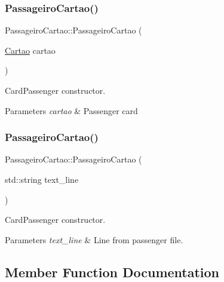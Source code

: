 \subsubsection{\texorpdfstring{Passageiro\+Cartao()}{PassageiroCartao()}\hspace{0.1cm}{\footnotesize\ttfamily [1/2]}}
{\footnotesize\ttfamily Passageiro\+Cartao\+::\+Passageiro\+Cartao (\begin{DoxyParamCaption}\item[{\hyperlink{class_cartao}{Cartao}}]{cartao }\end{DoxyParamCaption})}



Card\+Passenger constructor. 


\begin{DoxyParams}{Parameters}
{\em cartao} & Passenger card \\
\hline
\end{DoxyParams}
\mbox{\label{class_passageiro_cartao_a96bbc29d77b054eb31890230079f0961}} 
\subsubsection{\texorpdfstring{Passageiro\+Cartao()}{PassageiroCartao()}\hspace{0.1cm}{\footnotesize\ttfamily [2/2]}}
{\footnotesize\ttfamily Passageiro\+Cartao\+::\+Passageiro\+Cartao (\begin{DoxyParamCaption}\item[{std\+::string}]{text\+\_\+line }\end{DoxyParamCaption})}



Card\+Passenger constructor. 


\begin{DoxyParams}{Parameters}
{\em text\+\_\+line} & Line from passenger file. \\
\hline
\end{DoxyParams}


\subsection{Member Function Documentation}
\mbox{\label{class_passageiro_cartao_ac1c2a6ef96d46ffd0a37e757d1e605a1}} 
